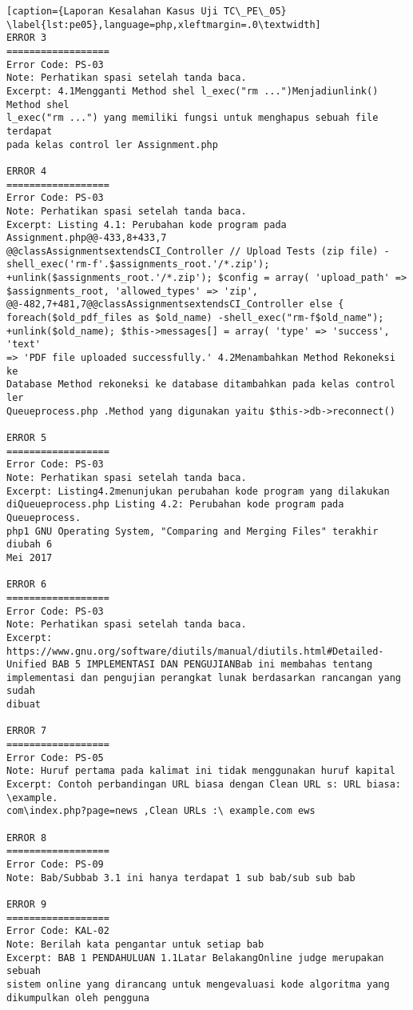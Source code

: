\begin{enumerate}
\begin{lstlisting}[caption={Laporan Kesalahan Kasus Uji TC\_PE\_05}	\label{lst:pe05},language=php,xleftmargin=.0\textwidth]
ERROR 3
==================
Error Code: PS-03
Note: Perhatikan spasi setelah tanda baca.
Excerpt: 4.1Mengganti Method shel l_exec("rm ...")Menjadiunlink() Method shel 
l_exec("rm ...") yang memiliki fungsi untuk menghapus sebuah file terdapat 
pada kelas control ler Assignment.php 

ERROR 4
==================
Error Code: PS-03
Note: Perhatikan spasi setelah tanda baca.
Excerpt: Listing 4.1: Perubahan kode program pada Assignment.php@@-433,8+433,7
@@classAssignmentsextendsCI_Controller // Upload Tests (zip file) -
shell_exec('rm-f'.$assignments_root.'/*.zip'); 
+unlink($assignments_root.'/*.zip'); $config = array( 'upload_path' => 
$assignments_root, 'allowed_types' => 'zip', 
@@-482,7+481,7@@classAssignmentsextendsCI_Controller else { 
foreach($old_pdf_files as $old_name) -shell_exec("rm-f$old_name"); 
+unlink($old_name); $this->messages[] = array( 'type' => 'success', 'text' 
=> 'PDF file uploaded successfully.' 4.2Menambahkan Method Rekoneksi ke 
Database Method rekoneksi ke database ditambahkan pada kelas control ler 
Queueprocess.php .Method yang digunakan yaitu $this->db->reconnect() 

ERROR 5
==================
Error Code: PS-03
Note: Perhatikan spasi setelah tanda baca.
Excerpt: Listing4.2menunjukan perubahan kode program yang dilakukan 
diQueueprocess.php Listing 4.2: Perubahan kode program pada Queueprocess.
php1 GNU Operating System, "Comparing and Merging Files" terakhir diubah 6 
Mei 2017

ERROR 6
==================
Error Code: PS-03
Note: Perhatikan spasi setelah tanda baca.
Excerpt: https://www.gnu.org/software/diutils/manual/diutils.html#Detailed-
Unified BAB 5 IMPLEMENTASI DAN PENGUJIANBab ini membahas tentang 
implementasi dan pengujian perangkat lunak berdasarkan rancangan yang sudah 
dibuat

ERROR 7
==================
Error Code: PS-05
Note: Huruf pertama pada kalimat ini tidak menggunakan huruf kapital
Excerpt: Contoh perbandingan URL biasa dengan Clean URL s: URL biasa: \example.
com\index.php?page=news ,Clean URLs :\ example.com ews 

ERROR 8
==================
Error Code: PS-09
Note: Bab/Subbab 3.1 ini hanya terdapat 1 sub bab/sub sub bab

ERROR 9
==================
Error Code: KAL-02
Note: Berilah kata pengantar untuk setiap bab
Excerpt: BAB 1 PENDAHULUAN 1.1Latar BelakangOnline judge merupakan sebuah 
sistem online yang dirancang untuk mengevaluasi kode algoritma yang 
dikumpulkan oleh pengguna
\end{lstlisting}
	
\end{enumerate}

